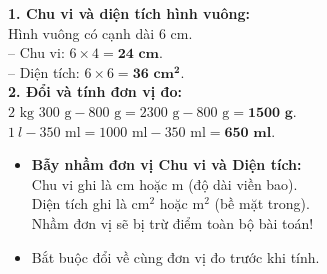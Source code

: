 \documentclass[11pt,a4paper]{article}
\begin{document}
\vspace{-2.5mm}
\noindent
\begin{minipage}[t]{0.49\textwidth}\vspace{0pt}
\begin{tcolorbox}[
  enhanced,
  colback=green!4!white,
  colframe=green!60!black,
  arc=2mm, boxrule=0.8pt,
  left=2mm, right=2mm, top=1.8mm, bottom=1.8mm,
  title={\footnotesize\bfseries\color{white}\faCheckCircle\ Ví dụ thực hành chuẩn mực}
]
{\footnotesize
\textbf{1. Chu vi và diện tích hình vuông:}\\
Hình vuông có cạnh dài $6\text{ cm}$.\\
-- Chu vi: $6 \times 4 = \mathbf{24\text{ cm}}$.\\
-- Diện tích: $6 \times 6 = \mathbf{36\text{ cm}^2}$.\\
\textbf{2. Đổi và tính đơn vị đo:}\\
$2\text{ kg } 300\text{ g} - 800\text{ g} = 2300\text{ g} - 800\text{ g} = \mathbf{1500\text{ g}}$.\\
$1\ l - 350\text{ ml} = 1000\text{ ml} - 350\text{ ml} = \mathbf{650\text{ ml}}$.
}
\end{tcolorbox}
\end{minipage}
\hfill
\begin{minipage}[t]{0.49\textwidth}\vspace{0pt}
\begin{tcolorbox}[
  enhanced,
  colback=red!4!white,
  colframe=red!70!black,
  arc=2mm, boxrule=0.8pt,
  left=2mm, right=2mm, top=1.8mm, bottom=1.8mm,
  title={\footnotesize\bfseries\color{white}\faExclamationTriangle\ Mẹo tránh bẫy trắc nghiệm}
]
{\footnotesize
\begin{itemize}\setlength{\itemsep}{1.5pt}\setlength{\leftskip}{-2.5mm}
  \item \textbf{Bẫy nhầm đơn vị Chu vi và Diện tích:}\\
  Chu vi ghi là $\text{cm}$ hoặc $\text{m}$ (độ dài viền bao).\\
  Diện tích ghi là $\text{cm}^2$ hoặc $\text{m}^2$ (bề mặt trong).\\
  Nhầm đơn vị sẽ bị trừ điểm toàn bộ bài toán!
  \item Bắt buộc đổi về cùng đơn vị đo trước khi tính.
\end{itemize}
}
\end{tcolorbox}
\end{minipage}
\end{document}
